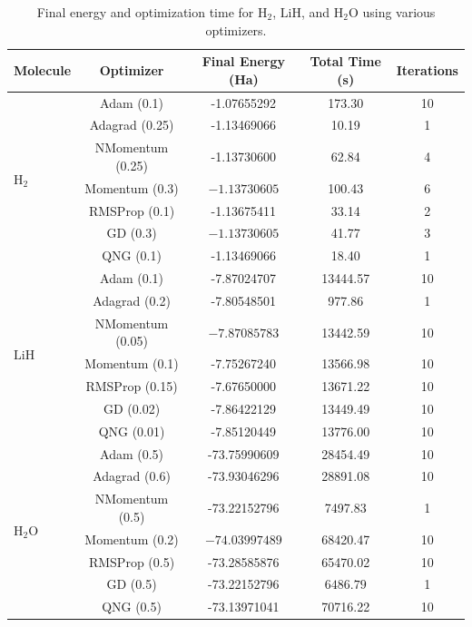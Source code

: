 \begin{table}[H]
  \centering
  \caption{Final energy and optimization time for \(\mathrm{H_2}\), \(\mathrm{LiH}\), and \(\mathrm{H_2O}\) using various optimizers.}
  \begin{scriptsize}
  \begin{tabular}{lcccc}
  \toprule
  \textbf{Molecule} & \textbf{Optimizer} & \textbf{Final Energy (Ha)} & \textbf{Total Time (s)} & \textbf{Iterations} \\
  \midrule
  \multirow{7}{*}{\(\mathrm{H_2}\)} 
  & Adam (0.1)       & -1.07655292  & 173.30  & 10 \\
  & Adagrad (0.25)   & -1.13469066  & 10.19   & 1 \\
  & NMomentum (0.25) & -1.13730600  & 62.84   & 4 \\
  & Momentum (0.3)   & \(\mathbf{-1.13730605}\) & 100.43 & 6 \\
  & RMSProp (0.1)    & -1.13675411  & 33.14   & 2 \\
  & GD (0.3)         & \(\mathbf{-1.13730605}\) & 41.77  & 3 \\
  & QNG (0.1)        & -1.13469066  & 18.40   & 1 \\
  \midrule
  \multirow{7}{*}{\(\mathrm{LiH}\)} 
  & Adam (0.1)       & -7.87024707  & 13444.57 & 10 \\
  & Adagrad (0.2)    & -7.80548501  & 977.86   & 1 \\
  & NMomentum (0.05) & \(\mathbf{-7.87085783}\) & 13442.59 & 10 \\
  & Momentum (0.1)   & -7.75267240  & 13566.98 & 10 \\
  & RMSProp (0.15)   & -7.67650000  & 13671.22 & 10 \\
  & GD (0.02)        & -7.86422129  & 13449.49 & 10 \\
  & QNG (0.01)       & -7.85120449  & 13776.00 & 10 \\
  \midrule
  \multirow{7}{*}{\(\mathrm{H_2O}\)} 
  & Adam (0.5)       & -73.75990609 & 28454.49 & 10 \\
  & Adagrad (0.6)    & -73.93046296 & 28891.08 & 10 \\
  & NMomentum (0.5)  & -73.22152796 & 7497.83  & 1 \\
  & Momentum (0.2)   & \(\mathbf{-74.03997489}\) & 68420.47 & 10 \\
  & RMSProp (0.5)    & -73.28585876 & 65470.02 & 10 \\
  & GD (0.5)         & -73.22152796 & \(\mathbf{6486.79}\) & 1 \\
  & QNG (0.5)        & -73.13971041 & 70716.22 & 10 \\
  \bottomrule
  \end{tabular}
  \end{scriptsize}
\end{table}
  

